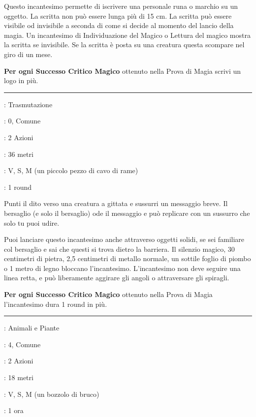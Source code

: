 \begin{multicols}{2}
Questo incantesimo permette di iscrivere una personale runa o marchio su un oggetto. La scritta non può essere lunga più di 15 cm. La scritta può essere visibile od invisibile a seconda di come si decide al momento del lancio della magia.
Un incantesimo di Individuazione del Magico o Lettura del magico mostra la scritta se invisibile.
Se la scritta è posta su una creatura questa scompare nel giro di un mese.

\textbf{Per ogni Successo Critico Magico} ottenuto nella Prova di Magia scrivi un logo in più.

\smallskip\noindent\rule{\linewidth}{2pt} \hypertarget{Messaggio}{}\medskip{}
\noindent
\begin{description}[noitemsep, topsep=0pt, parsep=0pt, partopsep=0pt, leftmargin=0cm, labelwidth=2.8cm]
	\item[\textbf{Lista di Magia}]: Trasmutazione
	\item[\textbf{Livello}]: 0, Comune
	\item[\textbf{T. di Lancio}]: 2 Azioni
	\item[\textbf{Gittata}]: 36 metri
	\item[\textbf{Componenti}]: V, S, M (un piccolo pezzo di cavo di rame)
	\item[\textbf{Durata}]: 1 round
\end{description}

Punti il dito verso una creatura a gittata e sussurri un messaggio breve. Il bersaglio (e solo il bersaglio) ode il messaggio e può replicare con un sussurro che solo tu puoi udire.

Puoi lanciare questo incantesimo anche attraverso oggetti solidi, se sei familiare col bersaglio e sai che questi si trova dietro la barriera. Il silenzio magico, 30 centimetri di pietra, 2,5 centimetri di metallo normale, un sottile foglio di piombo o 1 metro di legno bloccano l'incantesimo. L'incantesimo non deve seguire una linea retta, e può liberamente aggirare gli angoli o attraversare gli spiragli.

\textbf{Per ogni Successo Critico Magico} ottenuto nella Prova di Magia l'incantesimo dura 1 round in più.

\smallskip\noindent\rule{\linewidth}{2pt} \hypertarget{Metamorfosi}{}\medskip{}
\noindent
\begin{description}[noitemsep, topsep=0pt, parsep=0pt, partopsep=0pt, leftmargin=0cm, labelwidth=2.8cm]
	\item[\textbf{Lista di Magia}]: Animali e Piante
	\item[\textbf{Livello}]: 4, Comune
	\item[\textbf{T. di Lancio}]: 2 Azioni
	\item[\textbf{Gittata}]: 18 metri
	\item[\textbf{Componenti}]: V, S, M (un bozzolo di bruco)
	\item[\textbf{Durata}]: 1 ora
\end{description}


\end{multicols}
